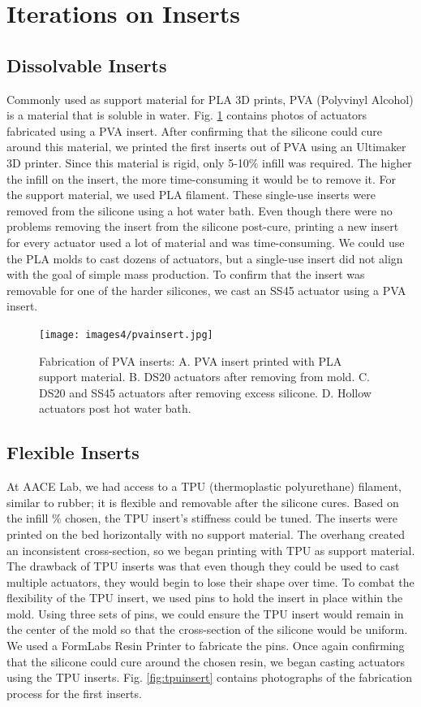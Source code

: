 \clearpage
\section{Iterations on Inserts}
\subsection{Dissolvable Inserts}
Commonly used as support material for PLA 3D prints, PVA (Polyvinyl Alcohol) is a material that is soluble in water. Fig. \ref{fig:pvainsert} contains photos of actuators fabricated using a PVA insert. After confirming that the silicone could cure around this material, we printed the first inserts out of PVA using an Ultimaker 3D printer. Since this material is rigid, only 5-10\% infill was required. The higher the infill on the insert, the more time-consuming it would be to remove it. For the support material, we used PLA filament. These single-use inserts were removed from the silicone using a hot water bath. Even though there were no problems removing the insert from the silicone post-cure, printing a new insert for every actuator used a lot of material and was time-consuming. We could use the PLA molds to cast dozens of actuators, but a single-use insert did not align with the goal of simple mass production. To confirm that the insert was removable for one of the harder silicones, we cast an SS45 actuator using a PVA insert.  

\begin{figure}[ht]
    \centering
    \texttt{[image: images4/pvainsert.jpg]}
    \caption{Fabrication of PVA inserts: A. PVA insert printed with PLA support material. B. DS20 actuators after removing from mold. C. DS20 and SS45 actuators after removing excess silicone. D. Hollow actuators post hot water bath.}
    \label{fig:pvainsert}
\end{figure}

\clearpage
\subsection{Flexible Inserts}
At AACE Lab, we had access to a TPU (thermoplastic polyurethane) filament, similar to rubber; it is flexible and removable after the silicone cures. Based on the infill \% chosen, the TPU insert's stiffness could be tuned. The inserts were printed on the bed horizontally with no support material. The overhang created an inconsistent cross-section, so we began printing with TPU as support material. The drawback of TPU inserts was that even though they could be used to cast multiple actuators, they would begin to lose their shape over time. To combat the flexibility of the TPU insert, we used pins to hold the insert in place within the mold. Using three sets of pins, we could ensure the TPU insert would remain in the center of the mold so that the cross-section of the silicone would be uniform. We used a FormLabs Resin Printer to fabricate the pins. Once again confirming that the silicone could cure around the chosen resin, we began casting actuators using the TPU inserts. Fig. \ref{fig:tpuinsert} contains photographs of the fabrication process for the first inserts. 

